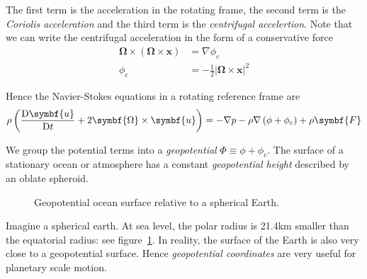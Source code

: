 \documentclass{jknotes}
\begin{document}
The first term is the acceleration in the rotating frame, the second term is
the \emph{Coriolis acceleration} and the third term is the \emph{centrifugal
accelertion}. Note that we can write the centrifugal acceleration in the form
of a conservative force
\begin{equation}
	\begin{aligned}
		\symbf{\Omega} \times \left( \symbf{\Omega} \times \symbf{x}\right) &= \nabla
	\phi_c \\
	\phi_c &= -\frac{1}{2} \left| \symbf{\Omega} \times \symbf{x} \right|^2
\end{aligned}
\end{equation}

Hence the Navier-Stokes equations in a rotating reference frame are
\begin{equation}
	\rho \left( \frac{\diffD \symbf{u}}{\diffD t} + 2 \symbf{\Omega} \times
	\symbf{u}\right) = - \nabla p - \rho \nabla \left( \phi + \phi_c\right) +
	\rho \symbf{F} \label{nsrot}
\end{equation}

We group the potential terms into a \emph{geopotential} $\Phi \equiv \phi +
\phi_c$. The surface of a stationary ocean or atmosphere has a constant
\emph{geopotential height} described by an oblate spheroid.

\begin{figure}
\begin{center}
\caption{Geopotential ocean surface relative to a spherical Earth.}
\label{fig:oblate}
\end{center}
\end{figure}

Imagine a spherical earth. At sea level, the polar radius is 21.4km smaller
than the equatorial radius: see figure~\ref{fig:oblate}. In reality, the
surface of the Earth is also very close to a geopotential surface. Hence
\emph{geopotential coordinates} are very useful for planetary scale motion.
\end{document}
